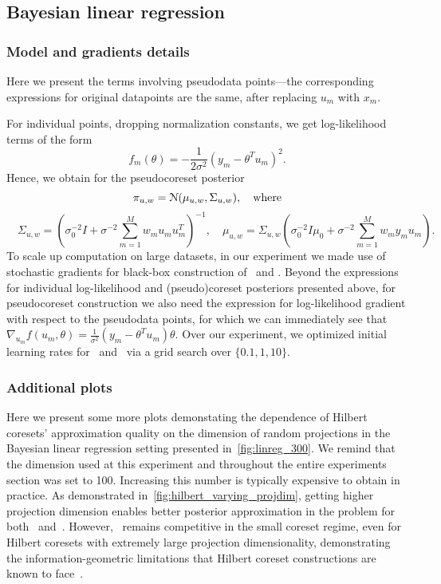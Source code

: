 \subsection{Bayesian linear regression}
\label{app:linear_regression_appendix}

\subsubsection{Model and gradients details}
\label{app:linreg_model_appendix}
Here we present the terms involving pseudodata points---the corresponding expressions for original datapoints are the same, after replacing $u_m$ with $x_m$.

For individual points, dropping normalization constants, we get log-likelihood terms of the form
\[
f_m(\theta) = -\frac{1}{2\sigma^2}\left(y_m - \theta^T u_m\right)^2.
\]
Hence, we obtain for the pseudocoreset posterior
\[
\pi_{u,w} = \mathcal{N}(\mu_{u,w}, \Sigma_{u,w}), \quad \text{where} 
\]
\[
\quad  \Sigma_{u,w} = \left(\sigma_0^{-2}I + \sigma^{-2}\sum_{m=1}^{M}w_m u_m u_m^T \right)^{-1},
\quad
\mu_{u,w} = \Sigma_{u,w}\left(\sigma_{0}^{-2}I\mu_0 + \sigma^{-2}\sum_{m=1}^{M}w_m y_m u_m\right).
\]
To scale up computation on large datasets, in our experiment we made use of stochastic gradients for black-box construction of \psvi~and \sparsevi. Beyond the expressions for individual log-likelihood and (pseudo)coreset posteriors presented above, for pseudocoreset construction we also need the expression for log-likelihood gradient with respect to the pseudodata points, for which we can immediately see that $\nabla_{u_m} f(u_m, \theta) = \frac{1}{\sigma^2}(y_m - \theta^Tu_m)\theta$. Over our experiment, we optimized initial learning rates for \sparsevi~and \psvi~via a grid search over ${\{0.1, 1, 10\}}$.

\subsubsection{Additional plots}
\label{app:linreg_plots_appendix}

Here we present some more plots demonstating the dependence of Hilbert coresets' approximation quality on the dimension of random projections in the Bayesian linear regression setting presented in~\cref{fig:linreg_300}. We remind that the dimension used at this experiment and throughout the entire experiments section was set to 100. Increasing this number is typically expensive to obtain in practice. As demonstrated in~\cref{fig:hilbert_varying_projdim}, getting higher projection dimension enables better posterior approximation in the problem for both \gigao~and~\gigar. However, \psvi~remains competitive in the small coreset regime, even for Hilbert coresets with extremely large projection dimensionality, demonstrating the information-geometric limitations that Hilbert coreset constructions are known to face~\citep{campbell19neurips}.

